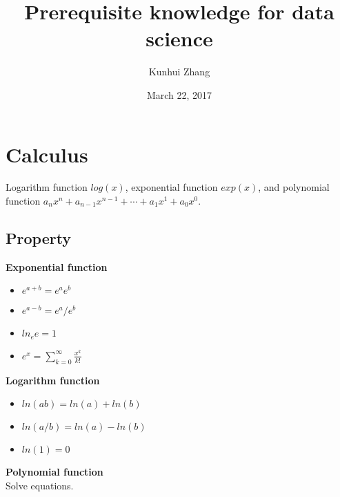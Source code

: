 \documentclass[a4paper,12pt]{article}
\begin{document}

% 

\title{Prerequisite knowledge for data science}
\author{Kunhui Zhang}
\date{March 22, 2017}
\maketitle

\section{Calculus}
Logarithm function $log(x)$, exponential function $exp(x)$, and polynomial function $a_nx^n + a_{n-1}x^{n-1} + \cdots + a_1x^1 + a_0x^0$.

\subsection{Property}
\textbf{Exponential function}
\begin{itemize}
\item $e^{a + b} = e^{a}e^{b}$
\item $e^{a - b} = e^{a}/e^{b}$
\item $ln_ee = 1$
\item $e^x = \sum_{k = 0}^{\infty} \frac{x^k}{k!}$
\end{itemize}
\textbf{Logarithm function}
\begin{itemize}
\item $ln(ab) = ln(a) + ln(b)$
\item $ln(a/b) = ln(a) - ln(b)$
\item $ln(1) = 0$
\end{itemize}
\textbf{Polynomial function} \\
Solve equations.
\end{document}
